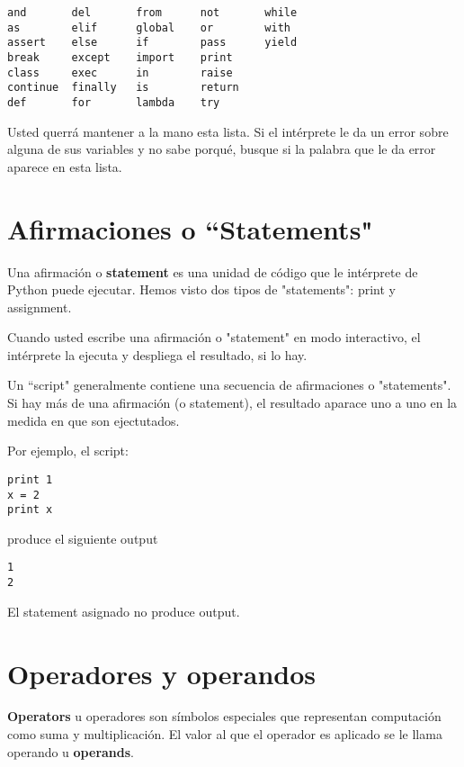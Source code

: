 \beforeverb
\begin{verbatim}
and       del       from      not       while    
as        elif      global    or        with     
assert    else      if        pass      yield    
break     except    import    print              
class     exec      in        raise              
continue  finally   is        return             
def       for       lambda    try
\end{verbatim}
\afterverb
%
Usted querr\'a mantener a la mano esta lista.  Si el int\'erprete le da un error sobre alguna de sus variables y no sabe porqu\'e, busque si la palabra que le da error aparece en esta lista.

\section{Afirmaciones o ``Statements"}

Una afirmaci\'on o {\bf statement} es una unidad de c\'odigo que le int\'erprete de Python puede ejecutar. Hemos visto dos tipos de "statements": print
y assignment.


Cuando usted escribe una afirmaci\'on o "statement" en modo interactivo, el int\'erprete la ejecuta y despliega el resultado, si lo hay.

Un ``script" generalmente contiene una secuencia de afirmaciones o "statements". Si hay m\'as de una afirmaci\'on (o statement), el resultado aparace uno a uno en la medida en que son ejectutados.

Por ejemplo, el script:

\beforeverb
\begin{verbatim}
print 1
x = 2
print x
\end{verbatim}
\afterverb
%
produce el siguiente output

\beforeverb
\begin{verbatim}
1
2
\end{verbatim}
\afterverb
%
El statement asignado no produce output.


\section{Operadores y operandos}

{\bf Operators} u operadores son s\'imbolos especiales que representan computaci\'on como suma y multiplicaci\'on. El valor al que el operador es aplicado se le llama operando u {\bf operands}.

